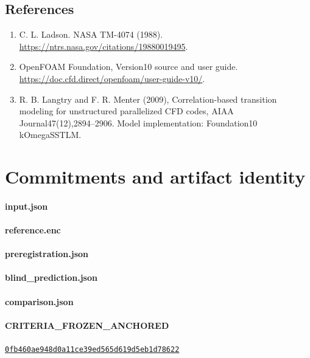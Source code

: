 \documentclass[10pt]{article}
\begin{document}
\subsection{References}
\begin{enumerate}
\item C. L. Ladson. NASA TM-4074 (1988). \url{https://ntrs.nasa.gov/citations/19880019495}.
\item OpenFOAM Foundation, Version10 source and user guide. \url{https://doc.cfd.direct/openfoam/user-guide-v10/}.
\item R. B. Langtry and F. R. Menter (2009), Correlation-based transition modeling for unstructured parallelized CFD codes, AIAA Journal47(12),2894--2906. Model implementation: Foundation10 kOmegaSSTLM.
\end{enumerate}
\clearpage\section{Commitments and artifact identity}
\paragraph{input.json}
{\small\ttfamily{}}
\paragraph{reference.enc}
{\small\ttfamily{}}
\paragraph{preregistration.json}
{\small\ttfamily{}}
\paragraph{blind\_prediction.json}
{\small\ttfamily{}}
\paragraph{comparison.json}
{\small\ttfamily{}}
\paragraph{CRITERIA\_FROZEN\_ANCHORED}
\href{https://github.com/alexthegreat714/alex-blythe-site/commit/0fb460ae948d0a11ce39ed565d619d5eb1d78622}{\texttt{0fb460ae948d0a11ce39ed565d619d5eb1d78622}}
\end{document}

